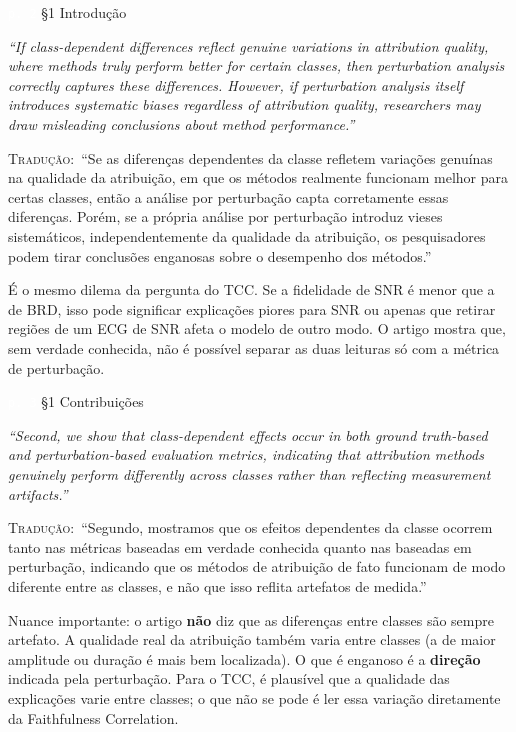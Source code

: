 \documentclass[11pt,a4paper]{article}
\newcommand{\pagechip}[1]{{\setlength{\fboxsep}{1.5pt}\colorbox{cAcc}{\textcolor{white}{\scriptsize\texttt{#1}}}}}
\newenvironment{origquote}{\par\itshape\small}{\par}
\newenvironment{tradquote}{\par\small\textsc{Tradução:}\ }{\par}
\newcommand{\explab}[1]{\par\smallskip{\small\color{cAcc}\textbf{\MakeUppercase{#1}}}\par}
\begin{document}
\begin{citacard}{\pagechip{p. 2} §1 Introdução}
\begin{origquote}“If class-dependent differences reflect genuine variations in attribution quality, where methods truly perform better for certain classes, then perturbation analysis correctly captures these differences. However, if perturbation analysis itself introduces systematic biases regardless of attribution quality, researchers may draw misleading conclusions about method performance.”\end{origquote}
\begin{tradquote}“Se as diferenças dependentes da classe refletem variações genuínas na qualidade da atribuição, em que os métodos realmente funcionam melhor para certas classes, então a análise por perturbação capta corretamente essas diferenças. Porém, se a própria análise por perturbação introduz vieses sistemáticos, independentemente da qualidade da atribuição, os pesquisadores podem tirar conclusões enganosas sobre o desempenho dos métodos.”\end{tradquote}
\explab{Explicação}
É o mesmo dilema da pergunta do TCC. Se a fidelidade de SNR é menor que a de BRD, isso pode significar explicações piores para SNR ou apenas que retirar regiões de um ECG de SNR afeta o modelo de outro modo. O artigo mostra que, sem verdade conhecida, não é possível separar as duas leituras só com a métrica de perturbação.
\end{citacard}

\begin{citacard}{\pagechip{p. 3} §1 Contribuições}
\begin{origquote}“Second, we show that class-dependent effects occur in both ground truth-based and perturbation-based evaluation metrics, indicating that attribution methods genuinely perform differently across classes rather than reflecting measurement artifacts.”\end{origquote}
\begin{tradquote}“Segundo, mostramos que os efeitos dependentes da classe ocorrem tanto nas métricas baseadas em verdade conhecida quanto nas baseadas em perturbação, indicando que os métodos de atribuição de fato funcionam de modo diferente entre as classes, e não que isso reflita artefatos de medida.”\end{tradquote}
\explab{Explicação}
Nuance importante: o artigo \textbf{não} diz que as diferenças entre classes são sempre artefato. A qualidade real da atribuição também varia entre classes (a de maior amplitude ou duração é mais bem localizada). O que é enganoso é a \textbf{direção} indicada pela perturbação. Para o TCC, é plausível que a qualidade das explicações varie entre classes; o que não se pode é ler essa variação diretamente da Faithfulness Correlation.
\end{citacard}
\end{document}
